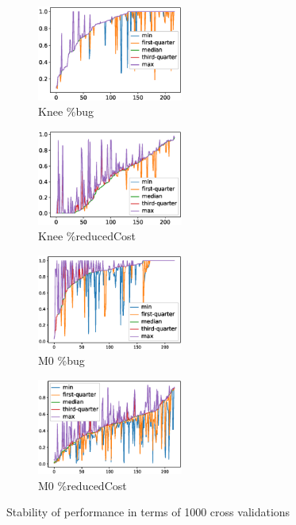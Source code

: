 \begin{figure}[t!]
\begin{subfigure}{0.24\textwidth}
    \includegraphics[width=4.8cm]{figure/knee-bug.eps}
	 \caption{Knee \%bug}
	 \label{fig:knee-b}
  \end{subfigure}
  \begin{subfigure}{0.24\textwidth}
    \includegraphics[width=4.8cm]{figure/knee-cost.eps}
	\caption{Knee \%reducedCost}
   \label{fig:knee-c}
  \end{subfigure}
  \begin{subfigure}{0.24\textwidth}
    \includegraphics[width=4.8cm]{figure/M0-bug.eps}
	\caption{M0 \%bug}
    \label{fig:m0-b}
  \end{subfigure}
  \begin{subfigure}{0.24\textwidth}
    \includegraphics[width=4.8cm]{figure/M0-cost.eps}
	\caption{M0 \%reducedCost}
    \label{fig:m0-c}
  \end{subfigure}
  \caption{Stability of performance in terms of 1000 cross validations }
  \label{fig:random}
\vspace{-0.1in}
\end{figure}


